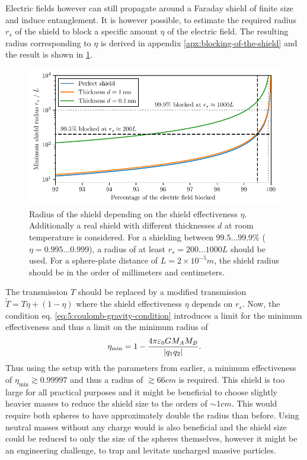 Electric fields however can still propagate around a Faraday shield of finite size and induce entanglement. It is however possible, to estimate the required radius $r_s$ of the shield to block a specific amount $\eta$ of the electric field.
The resulting radius corresponding to $\eta$ is derived in appendix \ref{apx:blocking-of-the-shield} and the result is shown in \cref{fig:5:shield-radius}.
\begin{figure}[!ht]
  \centering
  \includegraphics[width=\textwidth]{./../figures/others/shield-radius.pdf}
  \caption{Radius of the shield depending on the shield effectiveness $\eta$. Additionally a real shield with different thicknesses $d$ at room temperature is considered. For a shielding between $99.5...99.9\%$ ($\eta = 0.995...0.999$), a radius of at least $r_s =200...1000L$ should be used. For a sphere-plate distance of $L=2 \times 10^{-5}\si{m}$, the shield radius should be in the order of millimeters and centimeters.}
  \label{fig:5:shield-radius}
\end{figure}
The transmission $T$ should be replaced by a modified transmission $\tilde{T} = T\eta + (1-\eta)$ where the shield effectiveness $\eta$ depends on $r_s$. 
Now, the condition eq. \eqref{eq:5:coulomb-gravity-condition} introduces a limit for the minimum effectiveness and thus a limit on the minimum radius of
\begin{equation}
  \eta_\mathrm{min} = 1 - \frac{4\pi \varepsilon_0 G M_A M_B}{\left\lvert q_1 q_2\right\rvert} .
\end{equation}
Thus using the setup with the parameters from earlier, a minimum effectiveness of $\eta_\mathrm{min} \gtrsim 0.99997$ and thus a radius of $\gtrsim 66\si{cm}$ is required.
This shield is too large for all practical purposes and it might be beneficial to choose slightly heavier masses to reduce the shield size to the orders of $\sim 1\si{cm}$. This would require both spheres to have approximately double the radius than before.
Using neutral masses without any charge would is also beneficial and the shield size could be reduced to only the size of the spheres themselves, however it might be an engineering challenge, to trap and levitate uncharged massive particles.





